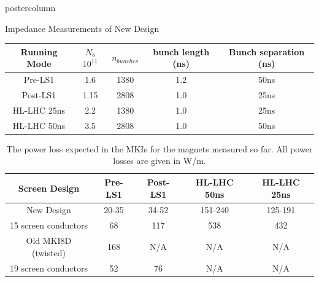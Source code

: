 \documentclass[final,hyperref={pdfpagelabels=false}]{beamer}
\begin{document}
\begin{frame}
\begin{columns}
\begin{column}{.49\textwidth}
\begin{beamercolorbox}[center,wd=\textwidth]{postercolumn}
\begin{minipage}[T]{.95\textwidth}
{\begin{block}{Impedance Measurements of New Design}
\begin{table}
\begin{center}
\begin{tabular}{c | c | c | c | c}
\small{Running Mode} & $N_{b}$ $10^{11}$ & $n_{bunches}$ & bunch length (ns) & Bunch separation (ns) \\ \hline 
\small{Pre-LS1} & 1.6 & 1380 & 1.2 & 50ns \\ \hline
\small{Post-LS1} & 1.15 & 2808 & 1.0 & 25ns \\ \hline
\small{HL-LHC 25ns}& 2.2 & 1380 & 1.0 & 25ns \\ \hline
\small{HL-LHC 50ns}& 3.5 & 2808 & 1.0 & 50ns \\
\end{tabular}
\end{center}
\end{table}

\begin{table}
\label{tab:heating-mki-screen-designs}
\caption{\small{The power loss expected  in the MKIs for the magnets measured so far. All power losses are given in W/m.}}
\begin{center}
\begin{tabular}{c | c | c | c | c}
\small{Screen Design} & \small{Pre-LS1} & \small{Post-LS1} & \small{HL-LHC 50ns} & \small{HL-LHC 25ns} \\ \hline 
\small{New Design} & 20-35 & 34-52 & 151-240 & 125-191 \\ \hline
\small{15 screen conductors} & 68 & 117 & 538 & 432 \\ \hline
\small{Old MKI8D (twisted)} & 168 & N/A & N/A & N/A \\ \hline
\small{19 screen conductors} & 52 & 76 & N/A & N/A \\
\end{tabular}
\end{center}
\end{table}


\end{block}}
\end{minipage}
\end{beamercolorbox}
\end{column}
\end{columns}
\end{frame}
\end{document}
